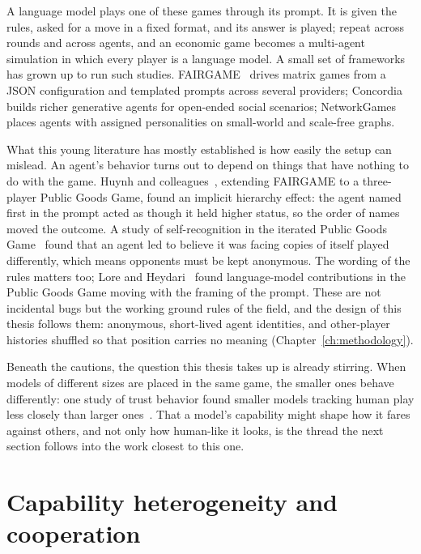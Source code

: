 A language model plays one of these games through its prompt. It is given the rules,
asked for a move in a fixed format, and its answer is played; repeat across rounds and
across agents, and an economic game becomes a multi-agent simulation in which every player
is a language model. A small set of frameworks has grown up to run such studies. FAIRGAME~\cite{fairgame2025} drives matrix games from a JSON
configuration and templated prompts across several providers; Concordia~\cite{concordia2023}
builds richer generative agents for open-ended social scenarios;
NetworkGames~\cite{networkgames2026} places agents with assigned personalities on
small-world and scale-free graphs.

What this young literature has mostly established is how easily the setup can mislead. An
agent's behavior turns out to depend on things that have nothing to do with the game.
Huynh and colleagues~\cite{huynh2025}, extending FAIRGAME to a three-player Public Goods
Game, found an implicit hierarchy effect: the agent named first in the prompt acted as
though it held higher status, so the order of names moved the outcome. A study of
self-recognition in the iterated Public Goods Game~\cite{aimirror2025} found that an agent
led to believe it was facing copies of itself played differently, which means opponents
must be kept anonymous. The wording of the rules matters too; Lore and
Heydari~\cite{loreheydari2023} found language-model contributions in the Public Goods Game
moving with the framing of the prompt. These are not incidental bugs but the working
ground rules of the field, and the design of this thesis follows them: anonymous,
short-lived agent identities, and other-player histories shuffled so that position carries
no meaning (Chapter~\ref{ch:methodology}).

Beneath the cautions, the question this thesis takes up is already stirring. When models
of different sizes are placed in the same game, the smaller ones behave differently: one
study of trust behavior found smaller models tracking human play less closely than larger
ones~\cite{canllmtrust2024}. That a model's capability might shape how it fares against
others, and not only how human-like it looks, is the thread the next section follows into
the work closest to this one.

\section{Capability heterogeneity and cooperation}
\label{sec:bg-capability}


